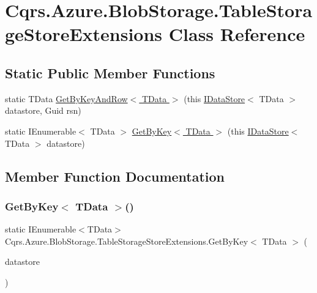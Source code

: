 \hypertarget{classCqrs_1_1Azure_1_1BlobStorage_1_1TableStorageStoreExtensions}{}\section{Cqrs.\+Azure.\+Blob\+Storage.\+Table\+Storage\+Store\+Extensions Class Reference}
\label{classCqrs_1_1Azure_1_1BlobStorage_1_1TableStorageStoreExtensions}
\subsection*{Static Public Member Functions}
\begin{DoxyCompactItemize}
\item 
static T\+Data \hyperlink{classCqrs_1_1Azure_1_1BlobStorage_1_1TableStorageStoreExtensions_a31a5a94e2caf554d17cde68d274a57c2_a31a5a94e2caf554d17cde68d274a57c2}{Get\+By\+Key\+And\+Row$<$ T\+Data $>$} (this \hyperlink{interfaceCqrs_1_1DataStores_1_1IDataStore}{I\+Data\+Store}$<$ T\+Data $>$ datastore, Guid rsn)
\item 
static I\+Enumerable$<$ T\+Data $>$ \hyperlink{classCqrs_1_1Azure_1_1BlobStorage_1_1TableStorageStoreExtensions_a773bb93cb6a1f7a5d8d0ff2bf245c655_a773bb93cb6a1f7a5d8d0ff2bf245c655}{Get\+By\+Key$<$ T\+Data $>$} (this \hyperlink{interfaceCqrs_1_1DataStores_1_1IDataStore}{I\+Data\+Store}$<$ T\+Data $>$ datastore)
\end{DoxyCompactItemize}


\subsection{Member Function Documentation}
\mbox{\label{classCqrs_1_1Azure_1_1BlobStorage_1_1TableStorageStoreExtensions_a773bb93cb6a1f7a5d8d0ff2bf245c655_a773bb93cb6a1f7a5d8d0ff2bf245c655}} 
\subsubsection{\texorpdfstring{Get\+By\+Key$<$ T\+Data $>$()}{GetByKey< TData >()}}
{\footnotesize\ttfamily static I\+Enumerable$<$T\+Data$>$ Cqrs.\+Azure.\+Blob\+Storage.\+Table\+Storage\+Store\+Extensions.\+Get\+By\+Key$<$ T\+Data $>$ (\begin{DoxyParamCaption}\item[{this \hyperlink{interfaceCqrs_1_1DataStores_1_1IDataStore}{I\+Data\+Store}$<$ T\+Data $>$}]{datastore }\end{DoxyParamCaption})\hspace{0.3cm}{\ttfamily [static]}}

